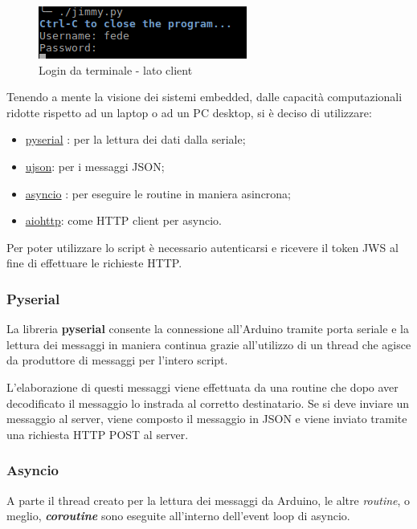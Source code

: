 \begin{figure}[!ht]
	\centering
	\includegraphics[scale=.8]{img/py.png}
	\caption{Login da terminale - lato client}\label{img:pythonTerminale}
\end{figure}

Tenendo a mente la visione dei sistemi embedded, dalle capacità computazionali ridotte rispetto ad un laptop o ad un PC desktop, si è deciso di utilizzare:
\begin{itemize}
	\item \href{https://github.com/pyserial/pyserial}{pyserial} : per la lettura dei dati dalla seriale;
	\item \href{https://github.com/pyserial/pyserial}{ujson}: per i messaggi JSON;
	\item \href{https://github.com/python/asyncio}{asyncio} : per eseguire le routine in maniera asincrona;
	\item \href{https://github.com/KeepSafe/aiohttp}{aiohttp}: come HTTP client per asyncio.
\end{itemize}
Per poter utilizzare lo script è necessario autenticarsi e ricevere il token JWS al fine di effettuare le richieste HTTP.

\subsubsection{Pyserial}
La libreria \textbf{pyserial} consente la connessione all'Arduino tramite porta seriale e la lettura dei messaggi in maniera continua grazie all'utilizzo di un thread che agisce da produttore di messaggi per l'intero script.

L'elaborazione di questi messaggi viene effettuata da una routine che dopo aver decodificato il messaggio lo instrada al corretto destinatario. Se si deve inviare un messaggio al server, viene composto il messaggio in JSON e viene inviato tramite una richiesta HTTP POST al server.

\subsubsection{Asyncio}
A parte il thread creato per la lettura dei messaggi da Arduino, le altre \textit{routine}, o meglio, \textit{\textbf{coroutine}} sono eseguite all'interno dell'event loop di asyncio. 

